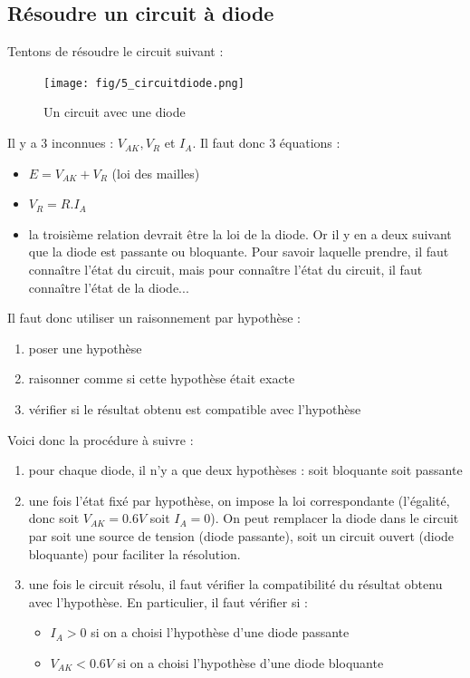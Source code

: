 \documentclass[a4paper]{article}
\begin{document}
    \subsection{Résoudre un circuit à diode}
    Tentons de résoudre le circuit suivant :
    \begin{figure}[H]
        \begin{center}
            \texttt{[image: fig/5\_circuitdiode.png]}
            \caption{Un circuit avec une diode}
            \label{fig:5_circuitdiode}
        \end{center}
    \end{figure}
    Il y a 3 inconnues : $V_{AK}, V_R$ et $I_A$. Il faut donc 3 équations :
    \begin{itemize}
        \item $E = V_{AK}+V_R$ (loi des mailles)
        \item $V_R = R.I_A$
        \item la troisième relation devrait être la loi de la diode. Or il y en a 
        deux suivant que la diode est passante ou bloquante. Pour savoir laquelle
        prendre, il faut connaître l'état du circuit, mais pour connaître l'état
        du circuit, il faut connaître l'état de la diode...
    \end{itemize}

    Il faut donc utiliser un raisonnement par hypothèse :
    \begin{enumerate}
        \item poser une hypothèse
        \item raisonner comme si cette hypothèse était exacte
        \item vérifier si le résultat obtenu est compatible avec l'hypothèse
    \end{enumerate}

    Voici donc la procédure à suivre :
    \begin{enumerate}
        \item pour chaque diode, il n'y a que deux hypothèses : soit bloquante soit passante
        \item une fois l'état fixé par hypothèse, on impose la loi correspondante (l'égalité, 
        donc soit $V_{AK} = 0.6V$ soit $I_A=0$). On peut remplacer la diode
        dans le circuit par soit une source de tension (diode passante), soit
        un circuit ouvert (diode bloquante) pour faciliter la résolution.
        \item une fois le circuit résolu, il faut vérifier la compatibilité
        du résultat obtenu avec l'hypothèse. En particulier, il faut vérifier si :
        \begin{itemize}
            \item $I_A >0$ si on a choisi l'hypothèse d'une diode passante
            \item $V_{AK} < 0.6V$ si on a choisi l'hypothèse d'une diode bloquante
        \end{itemize}
    \end{enumerate}
\end{document}
